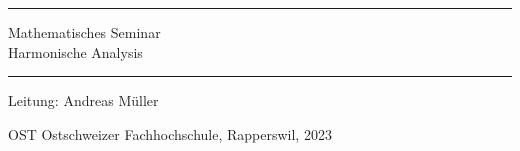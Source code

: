 %
%
\pagestyle{fancy}
\frontmatter
\newcommand\HRule{\noindent\rule{\linewidth}{1.5pt}}
\begin{titlepage}
\HRule
\vspace*{5pt}
\begin{flushright}
{
\LARGE
Mathematisches Seminar\\
\vspace*{20pt}
\Huge
Harmonische Analysis%
}%
\vspace*{5pt}
\end{flushright}
\HRule
\begin{flushright}
\vspace{60pt}
\Large
Leitung: Andreas Müller\\
\vspace{40pt}
\Large

\end{flushright}
\begin{center}
OST Ostschweizer Fachhochschule, Rapperswil, 2023
\end{center}
\end{titlepage}
